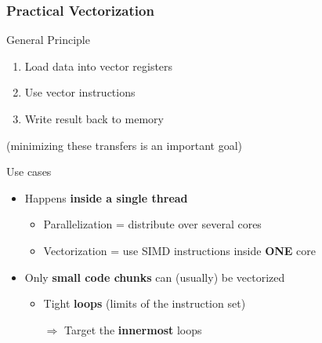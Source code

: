 \documentclass[xcolor={x11names,svgnames}]{beamer}
\newcommand{\red}[1]{{\color{red}#1}}
\begin{document}
\begin{frame}
  \frametitle{Practical Vectorization}

  \begin{block}{General Principle}
    \begin{enumerate}
    \item Load data into vector registers
    \item Use vector instructions
    \item Write result back to memory
    \end{enumerate}
  \end{block}

  (minimizing these transfers is an important goal)
  
  \begin{alertblock}{Use cases}
    \begin{itemize}
    \item Happens \textbf{inside a \alert{single} thread}
      \begin{itemize}
      \item Parallelization = distribute over several cores
      \item Vectorization = use SIMD instructions inside \textbf{\red{ONE}} core
      \end{itemize}
    \item Only \textbf{small code chunks} can (usually) be vectorized
      \begin{itemize}
      \item Tight \textbf{loops} (limits of the instruction set) 
      \item [$\Rightarrow$] Target the \textbf{innermost} loops
      \end{itemize}
    \end{itemize}
  \end{alertblock}
\end{frame}  

\end{document}

